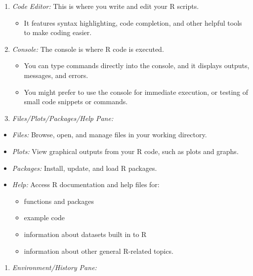 \documentclass[
]{article}
\providecommand{\tightlist}{%
  \setlength{\itemsep}{0pt}\setlength{\parskip}{0pt}}
\begin{document}
\begin{enumerate}
\def\labelenumi{\arabic{enumi}.}
\item
  \emph{Code Editor:} This is where you write and edit your R scripts.

  \begin{itemize}
  \tightlist
  \item
    It features syntax highlighting, code completion, and other helpful
    tools to make coding easier.
  \end{itemize}
\item
  \emph{Console:} The console is where R code is executed.

  \begin{itemize}
  \item
    You can type commands directly into the console, and it displays
    outputs, messages, and errors.
  \item
    You might prefer to use the console for immediate execution, or
    testing of small code snippets or commands.
  \end{itemize}
\item
  \emph{Files/Plots/Packages/Help Pane:}
\end{enumerate}

\begin{itemize}
\item
  \emph{Files:} Browse, open, and manage files in your working
  directory.
\item
  \emph{Plots:} View graphical outputs from your R code, such as plots
  and graphs.
\item
  \emph{Packages:} Install, update, and load R packages.
\item
  \emph{Help:} Access R documentation and help files for:

  \begin{itemize}
  \tightlist
  \item
    functions and packages
  \item
    example code
  \item
    information about datasets built in to R
  \item
    information about other general R-related topics.
  \end{itemize}
\end{itemize}

\begin{enumerate}
\def\labelenumi{\arabic{enumi}.}
\setcounter{enumi}{3}
\tightlist
\item
  \emph{Environment/History Pane:}
\end{enumerate}
\end{document}

